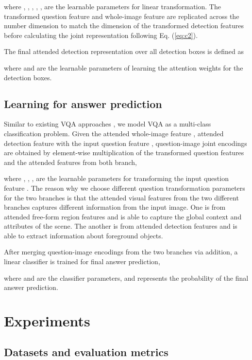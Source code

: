 \documentclass[letterpaper]{article}
\begin{document}
{where , ,  , , ,  are the learnable parameters for linear transformation. The transformed question feature  and whole-image feature  are replicated across the number dimension to match the dimension of the transformed detection features  before calculating the joint representation  following Eq. (\ref{eq:c2}).

The final attended detection representation  over all detection boxes is defined as

where  and  are the learnable parameters of learning the attention weights  for the detection boxes.


\subsection{Learning for answer prediction}\label{34}

Similar to existing VQA approaches \cite{antol2015vqa,lu2016hierarchical,fukui2016multimodal}, we model VQA as a multi-class classification problem. Given the attended whole-image feature , attended detection feature  with the input question feature , question-image joint encodings are obtained by element-wise multiplication of the transformed question features and the attended features from both branch,

where , , ,  are the learnable parameters for transforming the input question feature . The reason why we choose different question transformation parameters for the two branches is that the attended visual features from the two different branches captures different information from the input image. One is from attended free-form region features and is able to capture the global context and attributes of the scene. The another is from attended detection features and is able to extract information about foreground objects.

After merging question-image encodings from the two branches via addition, a linear classifier is trained for final answer prediction,

where  and  are the classifier parameters, and  represents the probability of the final answer prediction.





\section{Experiments}


\subsection{Datasets and evaluation metrics}

}
\end{document}
